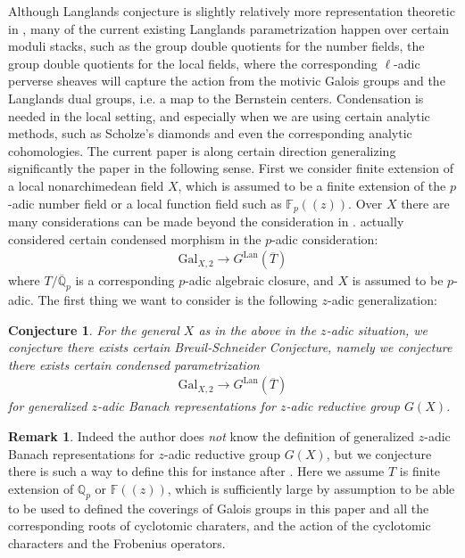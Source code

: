 \documentclass[12pt]{article}
\newtheorem{conjecture}{Conjecture}
\theoremstyle{definition}
\newtheorem{remark}{Remark}
\begin{document}
\noindent Although Langlands conjecture is slightly relatively more  representation theoretic in \cite{La}, many of the current existing Langlands parametrization happen over certain moduli stacks, such as the group double quotients for the number fields, the group double quotients for the local fields, where the corresponding $\ell$-adic perverse sheaves will capture the action from the motivic Galois groups and the Langlands dual groups, i.e. a map to the Bernstein centers. Condensation is needed in the local setting, and especially when we are using certain analytic methods, such as Scholze's diamonds and even the corresponding analytic cohomologies. The current paper is along certain direction generalizing significantly the paper \cite{BS} in the following sense. First we consider finite extension of a local nonarchimedean field $X$, which is assumed to be a finite extension of the $p$-adic number field or a local function field such as $\mathbb{F}_p((z))$. Over $X$ there are many considerations can be made beyond the consideration in \cite{BS}. \cite{BS} actually considered certain condensed morphism in the $p$-adic consideration:
\begin{align}
\mathrm{Gal}_{X,2} \rightarrow G^\mathrm{Lan}(\overline{T})
\end{align}
where $T/\overline{\mathbb{Q}}_p$ is a corresponding $p$-adic algebraic closure, and $X$ is assumed to be $p$-adic. The first thing we want to consider is the following $z$-adic generalization:

\begin{conjecture}
For the general $X$ as in the above in the $z$-adic situation, we conjecture there exists certain \textit{Breuil-Schneider Conjecture}, namely we conjecture there exists certain condensed parametrization 
\begin{align}
\mathrm{Gal}_{X,2} \rightarrow G^\mathrm{Lan}(\overline{T})
\end{align}
for generalized $z$-adic Banach representations for $z$-adic reductive group $G(X)$.
\end{conjecture}

\begin{remark}
Indeed the author does \textit{not} know the definition of generalized $z$-adic Banach representations for $z$-adic reductive group $G(X)$, but we conjecture there is such a way to define this for instance after \cite{EGH}. Here we assume $T$ is finite extension of $\mathbb{Q}_p$ or $\mathbb{F}((z))$, which is sufficiently large by assumption to be able to be used to defined the coverings of Galois groups in this paper and all the corresponding roots of cyclotomic charaters, and the action of the cyclotomic characters and the Frobenius operators.
\end{remark}
\end{document}
